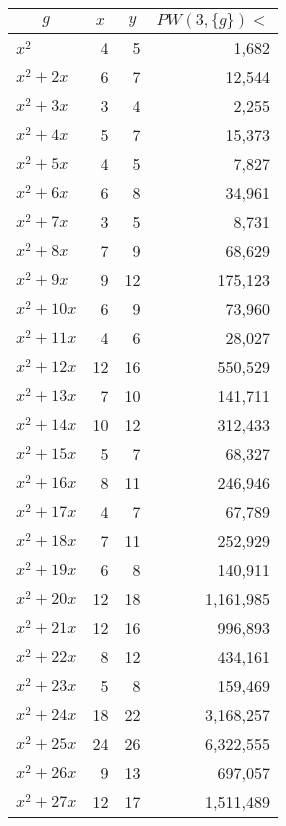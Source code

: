 \documentclass[a4paper]{amsproc}
\theoremstyle{plain}
\theoremstyle{named}
\begin{document}
\begin{longtable}{ | l | r | r | r | }
\caption{}\\
\hline

\multicolumn{1}{|c|}{$g$} &
\multicolumn{1}{|c|}{$x$} &
\multicolumn{1}{|c|}{$y$} &
\multicolumn{1}{|c|}{$PW(3, \{g\}) <$} \\ \hline
\endhead


$x^2$ & 4 & 5 & 1{,}682 \\ \hline
$x^2 + 2x$ & 6 & 7 & 12{,}544 \\ \hline
$x^2 + 3x$ & 3 & 4 & 2{,}255 \\ \hline
$x^2 + 4x$ & 5 & 7 & 15{,}373 \\ \hline
$x^2 + 5x$ & 4 & 5 & 7{,}827 \\ \hline
$x^2 + 6x$ & 6 & 8 & 34{,}961 \\ \hline
$x^2 + 7x$ & 3 & 5 & 8{,}731 \\ \hline
$x^2 + 8x$ & 7 & 9 & 68{,}629 \\ \hline
$x^2 + 9x$ & 9 & 12 & 175{,}123 \\ \hline
$x^2 + 10x$ & 6 & 9 & 73{,}960 \\ \hline
$x^2 + 11x$ & 4 & 6 & 28{,}027 \\ \hline
$x^2 + 12x$ & 12 & 16 & 550{,}529 \\ \hline
$x^2 + 13x$ & 7 & 10 & 141{,}711 \\ \hline
$x^2 + 14x$ & 10 & 12 & 312{,}433 \\ \hline
$x^2 + 15x$ & 5 & 7 & 68{,}327 \\ \hline
$x^2 + 16x$ & 8 & 11 & 246{,}946 \\ \hline
$x^2 + 17x$ & 4 & 7 & 67{,}789 \\ \hline
$x^2 + 18x$ & 7 & 11 & 252{,}929 \\ \hline
$x^2 + 19x$ & 6 & 8 & 140{,}911 \\ \hline
$x^2 + 20x$ & 12 & 18 & 1{,}161{,}985 \\ \hline
$x^2 + 21x$ & 12 & 16 & 996{,}893 \\ \hline
$x^2 + 22x$ & 8 & 12 & 434{,}161 \\ \hline
$x^2 + 23x$ & 5 & 8 & 159{,}469 \\ \hline
$x^2 + 24x$ & 18 & 22 & 3{,}168{,}257 \\ \hline
$x^2 + 25x$ & 24 & 26 & 6{,}322{,}555 \\ \hline
$x^2 + 26x$ & 9 & 13 & 697{,}057 \\ \hline
$x^2 + 27x$ & 12 & 17 & 1{,}511{,}489 \\ \hline

\end{longtable}
\end{document}

